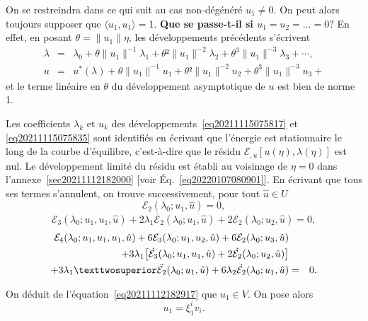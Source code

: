 \documentclass[12pt, final]{amsart}
\begin{document}
On se restreindra dans ce qui suit au cas non-dégénéré \(u_1\neq0\). On peut alors
toujours supposer que \(\langle u_1, u_1\rangle =1\). \textbf{Que se passe-t-il si
  \(u_1=u_2=\ldots=0 ?\)} En effet, en posant \(\theta=\lVert u_1\rVert \eta \), les développements
précédents s'écrivent
\begin{eqnarray}
  \lambda &=&\lambda _0+\theta\lVert u_1\rVert^{-1}\lambda _1+\theta²\lVert u_1\rVert^{-2}\lambda _2+\theta^3\lVert u_1\rVert^{-3}\lambda _3+\cdots,\\
  u&=&u^*(\lambda )+\theta\lVert u_1\rVert^{-1}u_1+\theta²\lVert u_1\rVert^{-2}u_2+\theta^3\lVert u_1\rVert^{-3}u_3+
\end{eqnarray}
et le terme linéaire en \(\theta\) du développement asymptotique de \(u\) est bien
de norme 1.

Les coefficients \(\lambda  _k\) et \(u_k\) des développements~\eqref{eq20211115075817}
et \eqref{eq20211115075835} sont identifiés en écrivant que l'énergie est
stationnaire le long de la courbe d'équilibre, c'est-à-dire que le résidu
\(\mathcal E_{,u}[u(\eta ), \lambda (\eta )]\) est nul. Le développement limité du résidu est établi au
voisinage de \(\eta =0\) dans l'annexe~\ref{sec20211112182000} [voir
Éq.~\eqref{eq20220107080901}]. En écrivant que tous ses termes s'annulent, on
trouve successivement, pour tout \(\hat{u}\in U\)
\begin{equation}
  \label{eq20211112182917}
  \mathcal E_2(\lambda _0; u_1, \hat{u})=0,
\end{equation}
\begin{equation}
  \label{eq20211112183220}
  \mathcal E_3(\lambda _0; u_1, u_1, \hat{u})+2\lambda _1\dot{\mathcal E_2}(\lambda _0; u_1, \hat{u})+2\mathcal E_2(\lambda _0; u_2, \hat{u})=0,
\end{equation}
\begin{eqnarray}
  \notag
  \mathcal E_4(\lambda _0; u_1, u_1, u_1, \hat{u})+6\mathcal E_3(\lambda _0; u_1, u_2, \hat{u})+6\mathcal E_2(\lambda _0; u_3, \hat{u})&&\\
  \notag
  +3\lambda _1\bigl[\dot{\mathcal E_3}(\lambda _0; u_1, u_1, \hat{u})+2\dot{\mathcal E_2}(\lambda _0; u_2, \hat{u})\bigr]&&\\
  \label{eq20220114135717}
  +3\lambda _1²\ddot{\mathcal E_2}(\lambda _0; u_1, \hat{u})
  +6\lambda _2\dot{\mathcal E_2}(\lambda _0; u_1, \hat{u})&=&0.
\end{eqnarray}

On déduit de l'équation~\eqref{eq20211112182917} que \(u_1\in V\). On pose alors
\begin{equation}
  \label{eq20220124135236}
  u_1=\xi _1^i v_i.
\end{equation}
\end{document}

